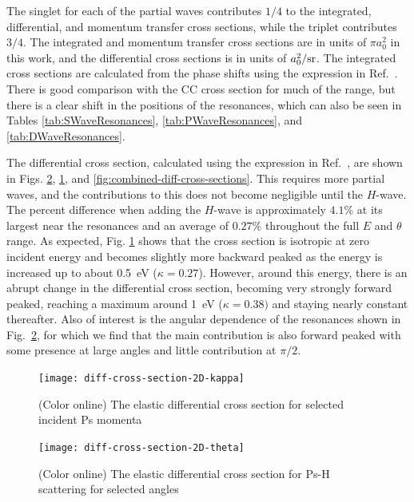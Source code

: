 \documentclass[preprint,showpacs,showkeys,preprintnumbers,amsmath,amssymb,longbibliography,pra,aps]{revtex4-1}
\begin{document}
The singlet for each of the partial waves contributes $1/4$ to the integrated,
differential, and momentum transfer cross sections, while the triplet
contributes $3/4$. The integrated and momentum transfer cross sections are
in units of $\pi a_0^2$ in this work, and the differential cross
sections is in units of $a_0^2 / \rm{sr}$.
The integrated cross sections are calculated
from the phase shifts using the expression in Ref.~\cite{Bransden2003}.
There is good comparison with the 
CC cross section \cite{Walters2004} for much of the range, but there is a 
clear shift in the positions of the resonances, which can also be seen in 
Tables \ref{tab:SWaveResonances}, \ref{tab:PWaveResonances}, and
\ref{tab:DWaveResonances}.

The differential cross section, calculated using the expression in
Ref.~\cite{Bransden2003}, are shown in Figs.
\ref{fig:diff-cross-section-2D-theta}, \ref{fig:diff-cross-section-2D-kappa},
and \ref{fig:combined-diff-cross-sections}. This requires more partial waves,
and the contributions to this does
not become negligible until the $H$-wave. The percent difference when adding 
the $H$-wave is approximately $4.1\%$ at its largest near the resonances and an 
average of $0.27\%$ throughout the full $E$ and $\theta$ range. As expected, 
Fig. \ref{fig:diff-cross-section-2D-kappa} shows that the cross section is 
isotropic at zero incident energy and becomes slightly more backward peaked 
as the energy is increased up to about \mbox{0.5 eV} ($\kappa = 0.27$). 
However, around this energy, there is an abrupt change in the differential 
cross section, becoming very strongly forward peaked, reaching a maximum 
around \mbox{1 eV} ($\kappa = 0.38)$ and staying nearly constant thereafter. 
Also of interest is the angular dependence of the resonances shown in
Fig.~\ref{fig:diff-cross-section-2D-theta}, for which we find that the main 
contribution is also forward peaked with some presence at large angles and 
little contribution at $\pi/2$.

\begin{figure}[H]
	\centering
	\texttt{[image: diff-cross-section-2D-kappa]}
	\caption{(Color online) The elastic differential cross section for selected
incident Ps momenta}
	\label{fig:diff-cross-section-2D-kappa}
\end{figure}

\begin{figure}[H]
	\centering
	\texttt{[image: diff-cross-section-2D-theta]}
	\caption{(Color online) The elastic differential cross section for Ps-H
scattering for selected angles}
	\label{fig:diff-cross-section-2D-theta}
\end{figure}
\end{document}
